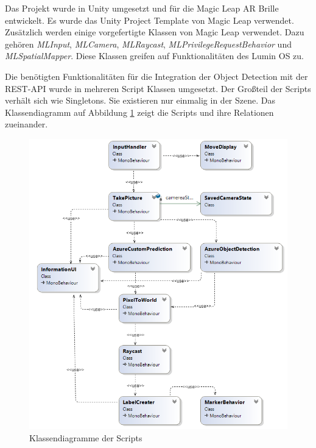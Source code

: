 Das Projekt wurde in Unity umgesetzt und für die Magic Leap AR Brille entwickelt.
Es wurde das Unity Project Template von Magic Leap verwendet. Zusätzlich werden einige vorgefertigte Klassen von Magic Leap verwendet. Dazu gehören \textit{MLInput}, \textit{MLCamera}, \textit{MLRaycast}, \textit{MLPrivilegeRequestBehavior} und \textit{MLSpatialMapper}. Diese Klassen greifen auf Funktionalitäten des Lumin OS zu.\citep{mlgetstarted}

Die benötigten Funktionalitäten für die Integration der Object Detection mit der REST-API wurde in mehreren Script Klassen umgesetzt. Der Großteil der Scripts verhält sich wie Singletons. Sie existieren nur einmalig in der Szene. Das Klassendiagramm auf Abbildung \ref{dia:classdiagramm} zeigt die Scripts und ihre Relationen zueinander.

\begin{figure}[H]
	\centering
	\includegraphics[width=1\textwidth]{images/klassendiagramm.png}
	\caption[Klassendiagramm der Skripts]{Klassendiagramme der Scripts}
	\label{dia:classdiagramm}
\end{figure}
 
